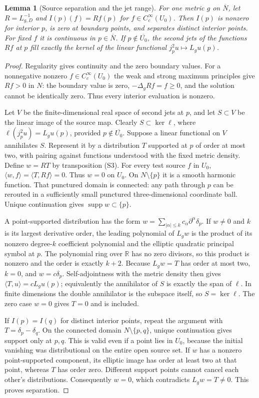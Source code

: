 \documentclass[11pt]{article}
\newtheorem{lemma}[theorem]{Lemma}
\theoremstyle{definition}
\theoremstyle{remark}
\numberwithin{equation}{section}
\begin{document}
\begin{lemma}[Source separation and the jet range]\label{data:jet-family}
For one metric $g$ on $\overline N$, let $R=L_{g,D}^{-1}$ and
$I(p)(f)=Rf(p)$ for $f\in C_c^\infty(U_0)$. Then $I(p)$ is nonzero
for interior $p$, is zero at boundary points, and separates distinct
interior points. For fixed $f$ it is continuous in $p\in\overline N$.
If $p\notin\overline{U_0}$, the second jets of the functions $Rf$
at $p$ fill exactly the kernel of the linear functional
$j_p^2u\mapsto L_gu(p)$.
\end{lemma}
\begin{proof}
Regularity gives continuity and the zero boundary values. For a
nonnegative nonzero $f\in C_c^\infty(U_0)$ the weak and strong maximum
principles give $Rf>0$ in $N$: the boundary value is zero,
$-\Delta_gRf=f\geq0$, and the solution cannot be identically zero.
Thus every interior evaluation is nonzero.

Let $V$ be the finite-dimensional real space of second jets at $p$,
and let $S\subset V$ be the linear image of the source map. Clearly
$S\subset\ker\ell$, where $\ell(j^2_pu)=L_gu(p)$, provided
$p\notin\overline{U_0}$. Suppose a linear functional on $V$
annihilates $S$. Represent it by a distribution $T$ supported at $p$
of order at most two, with pairing against functions understood with
the fixed metric density. Define $w=RT$ by transposition (S3).
For every test source $f$ in $U_0$,
$\langle w,f\rangle=\langle T,Rf\rangle=0$.
Thus $w=0$ on $U_0$. On $N\setminus\{p\}$ it is a smooth harmonic
function. That punctured domain is connected: any path through $p$
can be rerouted in a sufficiently small punctured three-dimensional
coordinate ball. Unique continuation gives
$\operatorname{supp}w\subset\{p\}$.

A point-supported distribution has the form
$w=\sum_{|\alpha|\leq k}c_\alpha\partial^\alpha\delta_p$.
If $w\ne0$ and $k$ is its largest derivative order, the leading
polynomial of $L_gw$ is the product of its nonzero degree-$k$
coefficient polynomial and the elliptic quadratic principal symbol
at $p$. The polynomial ring over $\mathbb R$ has no zero divisors,
so this product is nonzero and the order is exactly $k+2$.
Because $L_gw=T$ has order at most two, $k=0$, and $w=c\delta_p$.
Self-adjointness with the metric density then gives
$\langle T,u\rangle=cL_gu(p)$; equivalently the annihilator of
$S$ is exactly the span of $\ell$. In finite dimensions the double
annihilator is the subspace itself, so $S=\ker\ell$.
The zero case $w=0$ gives $T=0$ and is included.

If $I(p)=I(q)$ for distinct interior points, repeat the argument with
$T=\delta_p-\delta_q$. On the connected domain
$N\setminus\{p,q\}$, unique continuation gives support only at
$p,q$. This is valid even if a point lies in $U_0$, because the
initial vanishing was distributional on the entire open source set.
If $w$ has a nonzero point-supported component, its elliptic image
has order at least two at that point, whereas $T$ has order zero.
Different support points cannot cancel each other's distributions.
Consequently $w=0$, which contradicts $L_gw=T\ne0$.
This proves separation.
\end{proof}
\end{document}
